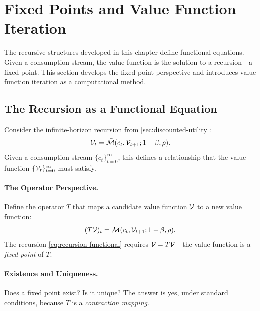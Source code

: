 \section{Fixed Points and Value Function Iteration}
\label{sec:fixed-points}

The recursive structures developed in this chapter define functional equations. Given a consumption stream, the value function is the solution to a recursion---a fixed point. This section develops the fixed point perspective and introduces value function iteration as a computational method.

\subsection{The Recursion as a Functional Equation}
\label{subsec:functional-equation}

Consider the infinite-horizon recursion from \cref{sec:discounted-utility}:
\begin{equation}
\mathcal{V}_t = \bar{\mathcal{M}}(c_t, \mathcal{V}_{t+1}; 1-\beta, \rho).
\label{eq:recursion-functional}
\end{equation}
Given a consumption stream $\{c_t\}_{t=0}^{\infty}$, this defines a relationship that the value function $\{\mathcal{V}_t\}_{t=0}^{\infty}$ must satisfy.

\paragraph{The Operator Perspective.}
Define the operator $T$ that maps a candidate value function $\mathcal{V}$ to a new value function:
\begin{equation}
(T\mathcal{V})_t = \bar{\mathcal{M}}(c_t, \mathcal{V}_{t+1}; 1-\beta, \rho).
\label{eq:operator-T}
\end{equation}
The recursion \cref{eq:recursion-functional} requires $\mathcal{V} = T\mathcal{V}$---the value function is a \emph{fixed point} of $T$.

\paragraph{Existence and Uniqueness.}
Does a fixed point exist? Is it unique? The answer is yes, under standard conditions, because $T$ is a \emph{contraction mapping}.

